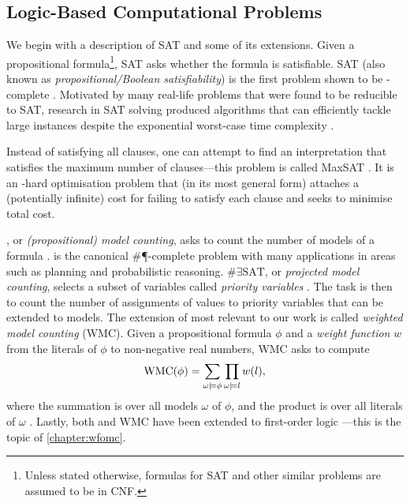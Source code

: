 \subsection{Logic-Based Computational Problems}\label{sec:logicproblems}


We begin with a description of SAT and some of its extensions. Given a
propositional formula\footnote{Unless stated otherwise, formulas for SAT and
  other similar problems are assumed to be in CNF.}, SAT asks whether the
formula is satisfiable. SAT (also known as \emph{propositional/Boolean
  satisfiability}) is the first problem shown to be \NP-complete
\citep{DBLP:conf/stoc/Cook71,levin1973universal}. Motivated by many real-life
problems that were found to be reducible to SAT, research in SAT solving
produced algorithms that can efficiently tackle large instances despite the
exponential worst-case time complexity \citep{DBLP:series/faia/2009-185}.

Instead of satisfying all clauses, one can attempt to find an interpretation
that satisfies the maximum number of clauses---this problem is called MaxSAT
\citep{bacchus2021maximum,DBLP:series/faia/LiM09}. It is an \NP-hard
optimisation problem that (in its most general form) attaches a (potentially
infinite) cost for failing to satisfy each clause and seeks to minimise total
cost.

\mc{}, or \emph{(propositional) model counting}, asks to count the number of
models of a formula \citep{DBLP:series/faia/GomesSS09}. \mc{} is the canonical
\#\P-complete problem with many applications in areas such as planning and
probabilistic reasoning. $\#\exists\textrm{SAT}$, or \emph{projected model
  counting}, selects a subset of variables called \emph{priority variables}
\citep{DBLP:conf/sat/AzizCMS15}. The task is then to count the number of
assignments of values to priority variables that can be extended to models. The
extension of \mc{} most relevant to our work is called \emph{weighted model
  counting} (WMC). Given a propositional formula $\phi$ and a \emph{weight
  function} $w$ from the literals of $\phi$ to non-negative real numbers, WMC
asks to compute
\[
\operatorname{WMC}(\phi) = \sum_{\omega \models \phi} \prod_{\omega \models l} w(l),
\]
where the summation is over all models $\omega$ of $\phi$, and the product is
over all literals of $\omega$ \citep{DBLP:journals/ai/ChaviraD08}. Lastly, both
\mc{} and WMC have been extended to first-order logic
\citep{DBLP:conf/ijcai/BroeckTMDR11}---this is the topic of
\cref{chapter:wfomc}.

